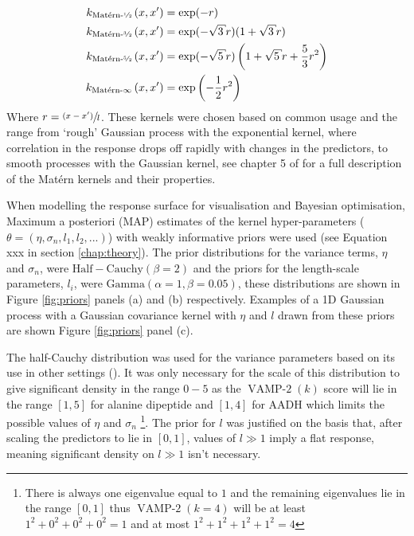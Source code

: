 \begin{align}
k_{\text{Mat\'{e}rn-\sfrac{1}{2}}}\left(x, x^{\prime}\right) &=\exp (-r) \\
k_{\text{Mat\'{e}rn-\sfrac{3}{2}}}\left(x, x^{\prime}\right) &= \exp (-\sqrt{3} r)(1+\sqrt{3} r) \\
k_{\text{Mat\'{e}rn-\sfrac{5}{2}}}\left(x, x^{\prime}\right) &= \exp (-\sqrt{5} r)\left(1+\sqrt{5} r+\frac{5}{3} r^{2}\right) \\
k_{\text{Mat\'{e}rn-}\infty}\left(x, x^{\prime}\right) &= \exp \left(-\frac{1}{2} r^{2}\right)
\end{align}
Where $r = \sfrac{(x-x^{\prime})}{l}$. These kernels were chosen based on common usage \cite{shahriariTakingHumanOut} and the range from `rough' Gaussian process with the exponential kernel, where correlation in the response drops off rapidly with changes in the predictors, to smooth processes with the Gaussian kernel, see chapter 5 of \cite{rasmussenGaussianProcessesMachine2006} for a full description of the Mat\'{e}rn kernels and their properties.  

When modelling the response surface for visualisation and Bayesian optimisation, Maximum a posteriori (MAP) estimates  of the kernel hyper-parameters ($\theta = (\eta, \sigma_{n}, l_{1}, l_{2}, ...)$) with weakly informative priors were used (see Equation xxx in section \ref{chap:theory}). The prior distributions for the variance terms, $\eta$ and $\sigma_{n}$, were $\mathrm{Half-Cauchy}(\beta=2)$ and the priors for the length-scale parameters, $l_{i}$, were $\mathrm{Gamma}(\alpha=1, \beta=0.05)$, these distributions are shown in Figure \ref{fig:priors} panels (a) and (b) respectively.  Examples of a 1D Gaussian process with a Gaussian covariance kernel with $\eta$ and $l$ drawn from these priors are shown Figure \ref{fig:priors} panel (c).  
 
The half-Cauchy distribution  was used for the variance parameters  based on its use in other settings (\cite{polsonHalfCauchyPriorGlobal2012}). It was  only necessary for the scale of this distribution to give significant density in the range $0-5$ as the $\operatorname{VAMP-2}(k)$ score will lie in the range $[1,5]$ for alanine dipeptide and $[1, 4]$ for AADH which limits the possible values of $\eta$ and $\sigma_{n}$ \footnote{There is always one eigenvalue equal to $1$ and the remaining eigenvalues lie in the range $[0, 1]$ thus $\operatorname{VAMP-2}(k=4)$ will be at least $1^2 + 0^2 + 0^2 + 0^2=1$ and at most $1^2 + 1^2 + 1^2 + 1^2=4$}. The prior for $l$ was justified on the basis that, after scaling the predictors to lie in $[0, 1]$, values of $l \gg 1$ imply a flat response, meaning significant density on $l \gg 1$ isn't necessary. 

